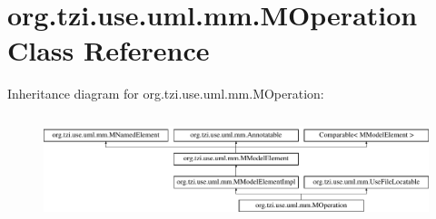 \hypertarget{classorg_1_1tzi_1_1use_1_1uml_1_1mm_1_1_m_operation}{\section{org.\-tzi.\-use.\-uml.\-mm.\-M\-Operation Class Reference}
\label{classorg_1_1tzi_1_1use_1_1uml_1_1mm_1_1_m_operation}
}
Inheritance diagram for org.\-tzi.\-use.\-uml.\-mm.\-M\-Operation\-:\begin{figure}[H]
\begin{center}
\leavevmode
\includegraphics[height=3.111111cm]{classorg_1_1tzi_1_1use_1_1uml_1_1mm_1_1_m_operation}
\end{center}
\end{figure}
